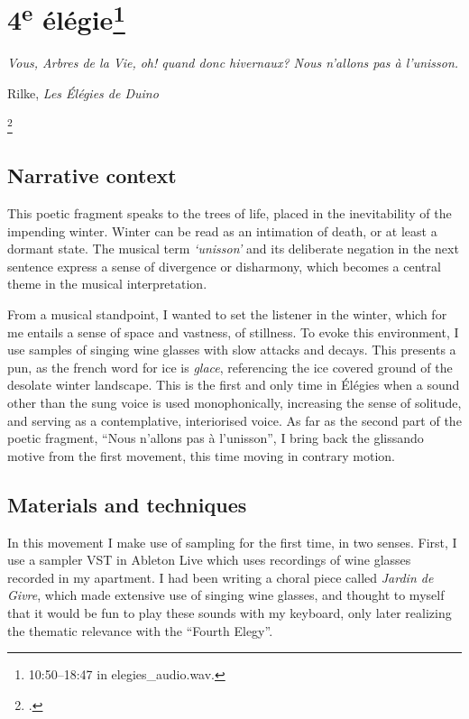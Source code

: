 \documentclass[12pt,twoside,maitrise]{dms_ks}
\theoremstyle{definition}
\begin{document}
{\section{4\textsuperscript{e} élégie\footnote{10:50--18:47 in elegies\_audio.wav.}}

\epigraph{\textit{Vous, Arbres de la Vie, oh! quand donc hivernaux? Nous n'allons pas à l'unisson.}}{Rilke, \textit{Les Élégies de Duino}\protect\footnotemark}

\footcitetext[39]{rilke_egies_1986}

\subsection{Narrative context}

This poetic fragment speaks to the trees of life, placed in the inevitability of the impending winter.
Winter can be read as an intimation of death, or at least a dormant state.
The musical term \textit{`unisson'} and its deliberate negation in the next sentence express a sense of divergence or disharmony, which becomes a central theme in the musical interpretation.

From a musical standpoint, I wanted to set the listener in the winter, which for me entails a sense of space and vastness, of stillness.
To evoke this environment, I use samples of singing wine glasses with slow attacks and decays.
This presents a pun, as the french word for ice is \textit{glace}, referencing the ice covered ground of the desolate winter landscape.
This is the first and only time in Élégies when a sound other than the sung voice is used monophonically, increasing the sense of solitude, and serving as a contemplative, interiorised voice.
As far as the second part of the poetic fragment, “Nous n'allons pas à l'unisson”, I bring back the glissando motive from the first movement, this time moving in contrary motion.

\subsection{Materials and techniques}

In this movement I make use of sampling for the first time, in two senses.
First, I use a sampler VST in Ableton Live which uses recordings of wine glasses recorded in my apartment.
I had been writing a choral piece called \textit{Jardin de Givre}, which made extensive use of singing wine glasses, and thought to myself that it would be fun to play these sounds with my keyboard, only later realizing the thematic relevance with the “Fourth Elegy”.

}
\end{document}
